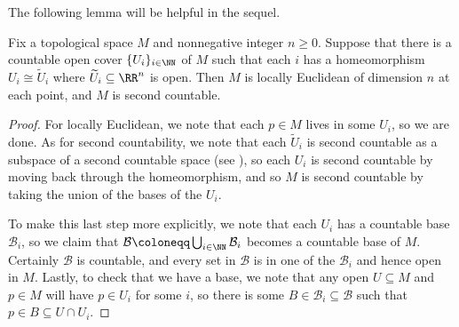 \documentclass[../notes.tex]{subfiles}
\begin{document}
The following lemma will be helpful in the sequel.
\begin{lemma} \label{lem:get-second-countable}
	Fix a topological space $M$ and nonnegative integer $n\ge0$. Suppose that there is a countable open cover $\{U_i\}_{i\in\NN}$ of $M$ such that each $i$ has a homeomorphism $U_i\cong\widetilde U_i$ where $\widetilde U_i\subseteq\RR^n$ is open. Then $M$ is locally Euclidean of dimension $n$ at each point, and $M$ is second countable.
\end{lemma}
\begin{proof}
	For locally Euclidean, we note that each $p\in M$ lives in some $U_i$, so we are done. As for second countability, we note that each $\widetilde U_i$ is second countable as a subspace of a second countable space (see ), so each $U_i$ is second countable by moving back through the homeomorphism, and so $M$ is second countable by taking the union of the bases of the $U_i$.
	
	To make this last step more explicitly, we note that each $U_i$ has a countable base $\mathcal B_i$, so we claim that $\mathcal B\coloneqq\bigcup_{i\in\NN}\mathcal B_i$ becomes a countable base of $M$. Certainly $\mathcal B$ is countable, and every set in $\mathcal B$ is in one of the $\mathcal B_i$ and hence open in $M$. Lastly, to check that we have a base, we note that any open $U\subseteq M$ and $p\in M$ will have $p\in U_i$ for some $i$, so there is some $B\in\mathcal B_i\subseteq\mathcal B$ such that $p\in B\subseteq U\cap U_i$.
\end{proof}
\end{document}
